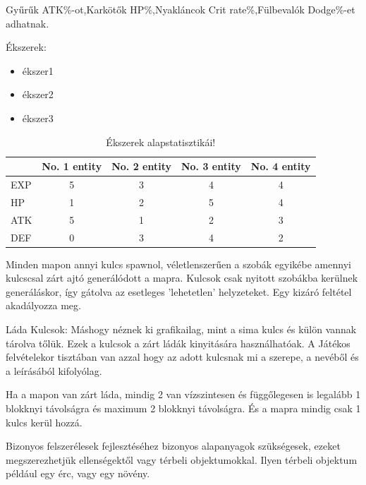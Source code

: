 \noindent Gyűrűk ATK\%-ot,Karkötők HP\%,Nyakláncok Crit rate\%,Fülbevalók Dodge\%-et adhatnak.

Ékszerek:

\begin{itemize}
  \item ékszer1
  \item ékszer2
  \item ékszer3
\end{itemize}
\begin{table}[h]
\centering
\caption{Ékszerek alapstatisztikái!}
\label{tab:minta}
\begin{tabular}{|l|c|c|c|c|}
\hline
 & No. 1 entity & No. 2 entity & No. 3 entity & No. 4 entity  \\
\hline
EXP & 5 & 3 & 4 & 4 \\
\hline
HP & 1 & 2 & 5 & 4 \\
\hline
ATK & 5 & 1 & 2 & 3 \\
\hline
DEF & 0 & 3 & 4 & 2 \\
\hline
\end{tabular}
\end{table}



Minden mapon annyi kulcs spawnol, véletlenszerűen a szobák egyikébe amennyi kulcs\-csal zárt ajtó generálódott a mapra.
Kulcsok csak nyitott szobákba kerülnek generáláskor, így gátolva az esetleges 'lehetetlen' helyzeteket. Egy kizáró feltétel akadályozza meg.

Láda Kulcsok:
Máshogy néznek ki grafikailag, mint a sima kulcs és külön vannak tárolva tőlük. Ezek a kulcsok a zárt ládák kinyitására használhatóak.
A Játékos felvételekor tisztában van azzal hogy az adott kulcsnak mi a szerepe, a nevéből és a leírásából kifolyólag.


Ha a mapon van zárt láda, mindig 2 van vízszintesen és függőlegesen is legalább 1 blokknyi távolságra és maximum 2 blokknyi távolságra. És a mapra mindig csak 1 kulcs kerül hozzá.



Bizonyos felszerélesek fejlesztéséhez bizonyos alapanyagok szükségesek, ezeket megszerezhetjük ellenségektől vagy térbeli objektumokkal.
Ilyen térbeli objektum például egy érc, vagy egy növény.


